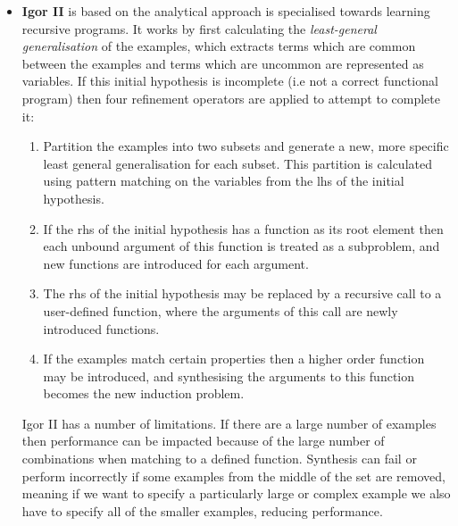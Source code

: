 \begin{itemize}
\item \textbf{Igor II} is based on the analytical approach is specialised towards learning recursive programs. It works by first calculating the \textit{least-general generalisation} of the examples, which extracts terms which are common between the examples and terms which are uncommon are represented as variables. If this initial hypothesis is incomplete (i.e not a correct functional program) then four refinement operators are applied to attempt to complete it:
\begin{enumerate}
\item Partition the examples into two subsets and generate a new, more specific least general generalisation for each subset. This partition is calculated using pattern matching on the variables from the lhs of the initial hypothesis.
\item If the rhs of the initial hypothesis has a function as its root element then each unbound argument of this function is treated as a subproblem, and new functions are introduced for each argument.
\item The rhs of the initial hypothesis may be replaced by a recursive call to a user-defined function, where the arguments of this call are newly introduced functions.
\item If the examples match certain properties then a higher order function may be introduced, and synthesising the arguments to this function becomes the new induction problem.
\end{enumerate}
Igor II has a number of limitations. If there are a large number of examples then performance can be impacted because of the large number of combinations when matching to a defined function. Synthesis can fail or perform incorrectly if some examples from the middle of the set are removed, meaning if we want to specify a particularly large or complex example we also have to specify all of the smaller examples, reducing performance.
\end{itemize}

\nocite{*}

\renewcommand\bibname{{References}}



\pagebreak